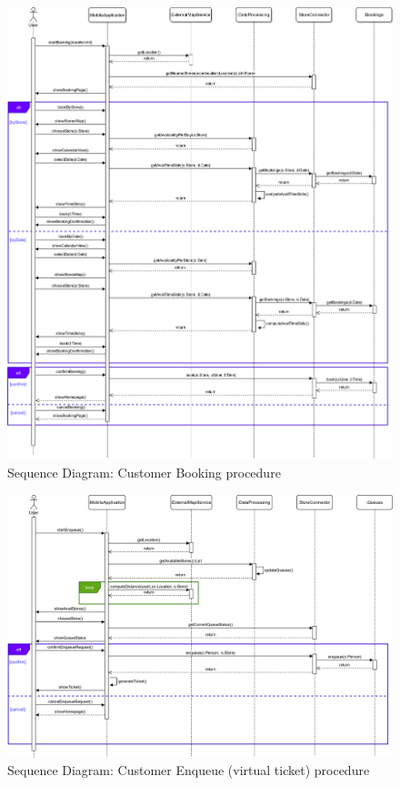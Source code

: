 \begin{figure}[H]
	\includegraphics[width=\linewidth]{../Diagrams/Sequence/sequence_customer_book.png}
	\caption{Sequence Diagram: Customer Booking procedure}
	\label{fig:sCusBook}
\end{figure}

\begin{figure}[H]
	\includegraphics[width=\linewidth]{../Diagrams/Sequence/sequence_customer_enqueue.png}
	\caption{Sequence Diagram: Customer Enqueue (virtual ticket) procedure}
	\label{fig:sCusEnq}
\end{figure}


